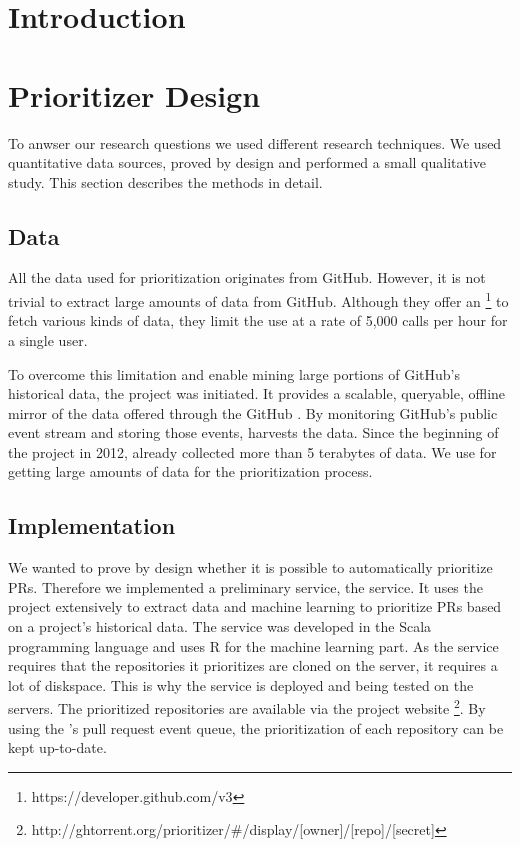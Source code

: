 \documentclass[conference]{IEEEtran}
\begin{document}



\section{Introduction}


\section{Prioritizer Design}
\label{sec:design}

To anwser our research questions we used different research techniques.
We used quantitative data sources, proved by design and performed a small qualitative study.
This section describes the methods in detail.

\subsection{Data}
All the data used for prioritization originates from GitHub.
However, it is not trivial to extract large amounts of data from GitHub.
Although they offer an \api\footnote{https://developer.github.com/v3} to fetch various kinds of data, they limit the use at a rate of 5,000 \api calls per hour for a single user.

To overcome this limitation and enable mining large portions of GitHub's historical data, the \ghtorrent project \cite{Gousi13} was initiated.
It provides a scalable, queryable, offline mirror of the data offered through the GitHub \api.
By monitoring GitHub's public event stream and storing those events, \ghtorrent harvests the data.
Since the beginning of the project in 2012, \ghtorrent already collected more than 5 terabytes of data.
We use \ghtorrent for getting large amounts of data for the prioritization process.

\subsection{Implementation}
We wanted to prove by design whether it is possible to automatically prioritize PRs.
Therefore we implemented a preliminary service, the \prioritizer service.
It uses the \ghtorrent project extensively to extract data and machine learning to prioritize PRs based on a project's historical data.
The service was developed in the Scala programming language and uses R for the machine learning part.
As the service requires that the repositories it prioritizes are cloned on the server, it requires a lot of diskspace.
This is why the service is deployed and being tested on the \ghtorrent servers.
The prioritized repositories are available via the \ghtorrent project website \footnote{http://ghtorrent.org/prioritizer/\#/display/[owner]/[repo]/[secret]}.
By using the \ghtorrent's pull request event queue, the prioritization of each repository can be kept up-to-date.
\end{document}
